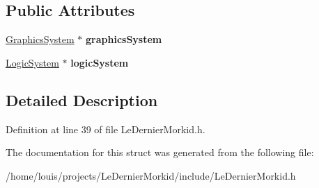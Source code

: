 \subsection*{Public Attributes}
\begin{DoxyCompactItemize}
\item 
\mbox{\label{struct_le_dernier_morkid_1_1_le_dernier_morkid_thread_data_a14ad8e710579039f8041e3951b33a14d}} 
\hyperlink{class_common_1_1_graphics_system}{Graphics\+System} $\ast$ {\bfseries graphics\+System}
\item 
\mbox{\label{struct_le_dernier_morkid_1_1_le_dernier_morkid_thread_data_a6e300a8af696aaed836729396ed5f219}} 
\hyperlink{class_common_1_1_logic_system}{Logic\+System} $\ast$ {\bfseries logic\+System}
\end{DoxyCompactItemize}


\subsection{Detailed Description}


Definition at line 39 of file Le\+Dernier\+Morkid.\+h.



The documentation for this struct was generated from the following file\+:\begin{DoxyCompactItemize}
\item 
/home/louis/projects/\+Le\+Dernier\+Morkid/include/Le\+Dernier\+Morkid.\+h\end{DoxyCompactItemize}
